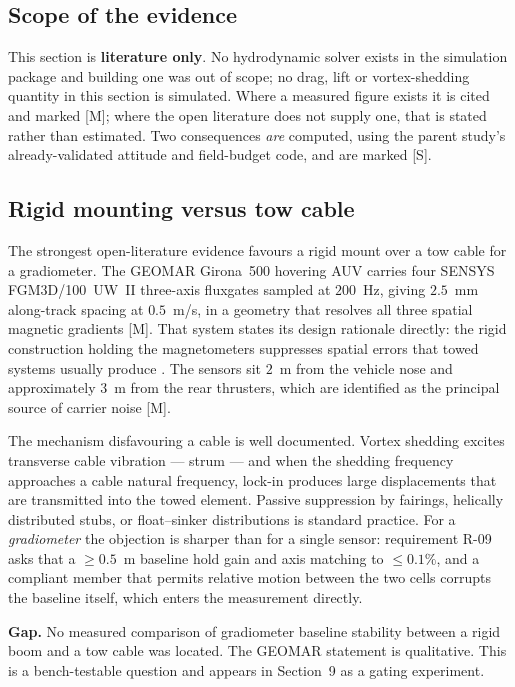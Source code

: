 \documentclass[11pt]{article}
\newcommand{\meas}{\textcolor{blue!55!black}{\footnotesize[M]}}
\newcommand{\sig}{\textcolor{violet!70!black}{\footnotesize[S]}}
\begin{document}
\subsection{Scope of the evidence}
This section is \textbf{literature only}. No hydrodynamic solver exists in the
simulation package and building one was out of scope; no drag, lift or
vortex-shedding quantity in this section is simulated. Where a measured figure
exists it is cited and marked \meas; where the open literature does not supply
one, that is stated rather than estimated. Two consequences \emph{are} computed,
using the parent study's already-validated attitude and field-budget code, and
are marked \sig.

\subsection{Rigid mounting versus tow cable}
The strongest open-literature evidence favours a rigid mount over a tow cable
for a gradiometer. The GEOMAR Girona~500 hovering AUV carries four SENSYS
FGM3D/100~UW~II three-axis fluxgates sampled at $200$~Hz, giving $2.5$~mm
along-track spacing at $0.5$~m/s, in a geometry that resolves all three spatial
magnetic gradients \cite{seidel23sheet}\meas. That system states its design
rationale directly: the rigid construction holding the magnetometers suppresses
spatial errors that towed systems usually produce \cite{seidel23sheet}. The
sensors sit $2$~m from the vehicle nose and approximately $3$~m from the rear
thrusters, which are identified as the principal source of carrier noise
\cite{seidel2023}\meas.

The mechanism disfavouring a cable is well documented. Vortex shedding excites
transverse cable vibration --- strum --- and when the shedding frequency
approaches a cable natural frequency, lock-in produces large displacements that
are transmitted into the towed element. Passive suppression by fairings,
helically distributed stubs, or float--sinker distributions is standard practice.
For a \emph{gradiometer} the objection is sharper than for a single sensor:
requirement R-09 asks that a $\geq0.5$~m baseline hold gain and axis matching to
$\leq0.1\%$, and a compliant member that permits relative motion between the two
cells corrupts the baseline itself, which enters the measurement directly.

\textbf{Gap.} No measured comparison of gradiometer baseline stability between a
rigid boom and a tow cable was located. The GEOMAR statement is qualitative. This
is a bench-testable question and appears in Section~9 as a gating experiment.
\end{document}
